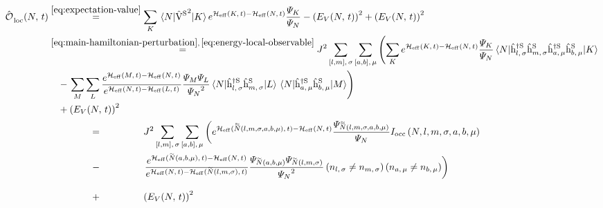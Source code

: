 \begin{equation}
    \label{eq:v-squared-hard-computation}
    \begin{split}
        \localObservable{N}{t} &\stackrel{\ref{eq:expectation-value}}{=}
        \lsum[K] \bracketHelper{N}{{\Vhamiltonian[\schroedingerPicture]}^2}{K} e^{\HeffOft[K]-\HeffOft[N]}
        \frac{
            \psiN[K]
        }{
            \psiN[N]
        }  - \left(E_V(N,\,t)\right)^2 + \left(E_V(N,\,t)\right)^2\\
        &\stackrel{\ref{eq:main-hamiltonian-perturbation},\,\ref{eq:energy-local-observable}}{=}
        J^2 \fullneighborsum[,\,\sigma]{l}{m}\fullneighborsum[,\,\mu]{a}{b}
        \left(
            \lsum[K]
            e^{\HeffOft[K]-\HeffOft[N]}
            \frac{
                \psiN[K]
            }{
                \psiN[N]
            }
            \bracketHelper{N}{\withspinhcop[\schroedingerPicture]{l}{\sigma}{\dagger}\withspinhcop[\schroedingerPicture]{m}{\sigma}{}\withspinhcop[\schroedingerPicture]{a}{\mu}{\dagger}\withspinhcop[\schroedingerPicture]{b}{\mu}{}}{K}
        \right.
        \\&\quad-
        \left.
            \lsum[M]
            \lsum[L]
            \frac{e^{\HeffOft[M]-\HeffOft[N]}}{e^{\HeffOft[N]-\HeffOft[L]}}
            \frac{
                \psiN[M]\psiN[L]
            }{
                {\psiN[N]}^2
            }
            \bracketHelper{N}{\withspinhcop[\schroedingerPicture]{l}{\sigma}{\dagger}\withspinhcop[\schroedingerPicture]{m}{\sigma}{}}{L}
            \bracketHelper{N}{\withspinhcop[\schroedingerPicture]{a}{\mu}{\dagger}\withspinhcop[\schroedingerPicture]{b}{\mu}{}}{M}
        \right) 
        \\&\quad + \left(E_V(N,\,t)\right)^2
        \\&\stackrel{\phantom{\ref{eq:expectation-value}}}{=}
        J^2 \fullneighborsum[,\,\sigma]{l}{m}\fullneighborsum[,\,\mu]{a}{b}
        \left(
            e^{\HeffOft[\vphantom{N}\smash{\tildetilde{N}}(l,m,\sigma,a,b,\mu)]-\HeffOft[N]}
            \frac{
                \psiN[\vphantom{N}\smash{\tildetilde{N}}(l,m,\sigma,a,b,\mu)]
            }{
                \psiN[N]
            }
            I_\text{occ}\left(N, l,m,\sigma,a,b,\mu\right)
        \right.
        \\&\stackrel{\phantom{\ref{eq:expectation-value}}}{-}
        \left.
            \frac{e^{\HeffOft[\vphantom{N}\smash{\tilde{N}}(a,b,\mu)]-\HeffOft[N]}}{e^{\HeffOft[N]-\HeffOft[\vphantom{N}\smash{\tilde{N}}(l,m,\sigma)]}}
            \frac{
                \psiN[\vphantom{N}\smash{\tilde{N}}(a,b,\mu)]\psiN[\vphantom{N}\smash{\tilde{N}}(l,m,\sigma)]
            }{
                {\psiN[N]}^2
            }
            \left(n_{l,\,\sigma} \neq n_{m,\,\sigma}\right)
            \left(n_{a,\,\mu} \neq n_{b,\,\mu}\right)
        \right) 
        \\&\stackrel{\phantom{\ref{eq:expectation-value}}}{+} \left(E_V(N,\,t)\right)^2
    \end{split}
\end{equation}

